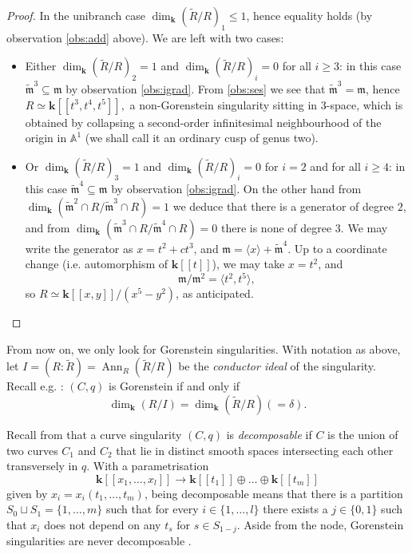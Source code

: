 \documentclass{compositio}
\renewcommand{\k}{\mathbf k}
\newcommand{\m}{\mathfrak m}
\newcommand{\tR}{\widetilde{R}}
\newcommand{\tm}{\widetilde{\mathfrak m}}
\renewcommand{\to}{\rightarrow}
\newcommand{\Aaff}{\mathbb A}
\theoremstyle{plain}
\theoremstyle{definition}
\theoremstyle{remark}
\begin{document}
\begin{proof}
 In the unibranch case $\dim_\k(\tR/R)_1\leq 1$, hence equality holds (by observation \eqref{obs:add} above). We are left with two cases:
 \begin{itemize}[leftmargin=15pt]
  \item Either $\dim_\k(\tR/R)_2=1$ and $\dim_\k(\tR/R)_i=0$ for all $i\geq 3$: in this case $\tm^3\subseteq\m$ by observation \eqref{obs:igrad}. From \eqref{obs:ses} we see that $\tm^3=\m$, hence $R\simeq\k[\![t^3,t^4,t^5]\!],$ a non-Gorenstein singularity sitting in $3$-space, which is obtained by collapsing a second-order infinitesimal neighbourhood of the origin in $\Aaff^1$ (we shall call it an ordinary cusp of genus two).
  
  \item Or $\dim_\k(\tR/R)_3=1$ and $\dim_\k(\tR/R)_i=0$ for $i=2$ and for all $i\geq 4$: in this case $\tm^4\subseteq\m$ by observation \eqref{obs:igrad}. On the other hand from $\dim_\k(\tm^2\cap R/\tm^3\cap R)=1$ we deduce that there is a generator of degree $2$, and from $\dim_\k(\tm^3\cap R/\tm^4\cap R)=0$ there is none of degree $3$. We may write the generator as $x=t^2+ct^3$, and $\m=\langle x\rangle+\tm^4$. Up to a coordinate change (i.e. automorphism of $\k[\![t]\!]$), we may take $x=t^2$, and \[\m/\m^2=\langle t^2,t^5\rangle,\] so $R\simeq\k[\![x,y]\!]/(x^5-y^2)$, as anticipated.
 \end{itemize}
\end{proof}

From now on, we only look for Gorenstein singularities. With notation as above, let $I=(R:\tilde R)=\operatorname{Ann}_R(\tilde R/R)$ be the \emph{conductor ideal} of the singularity. Recall e.g. \cite[Proposition VIII.1.16]{AK}: $(C,q)$ is Gorenstein if and only if
\[\dim_\k(R/I)=\dim_\k(\tR/R)(=\delta).\]

Recall from \cite[Definition 2-1]{Stev} that a curve singularity $(C,q)$ is \emph{decomposable} if $C$ is the union of two curves $C_1$ and $C_2$ that lie in distinct smooth spaces intersecting each other transversely in $q$. With a parametrisation \[\k[\![x_1,\ldots,x_l]\!]\to\k[\![t_1]\!]\oplus\ldots\oplus\k[\![t_m]\!]\] given by $x_i=x_i(t_1,\ldots,t_m)$, being decomposable means that there is a partition $S_0\sqcup S_1=\{1,\ldots,m\}$ such that for every $i\in\{1,\ldots,l\}$ there exists a $j\in\{0,1\}$ such that $x_i$ does not depend on any $t_s$ for $s\in S_{1-j}$. Aside from the node, Gorenstein singularities are never decomposable \cite[Proposition 2.1]{AFSGm}.
\end{document}
